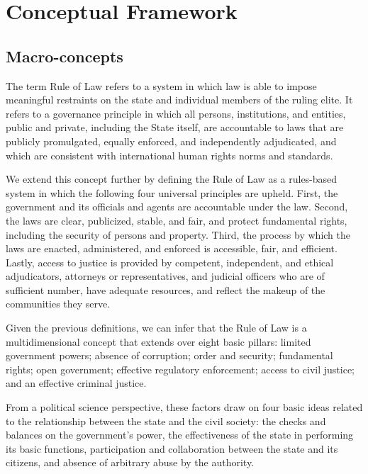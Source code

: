 \documentclass[
]{agujournal2019}
\begin{document}
\section[Conceptual Framework]{\texorpdfstring{Conceptual
Framework}{Conceptual Framework}}\label{conceptual-framework1}

\subsection{Macro-concepts}\label{macro-concepts}

The term Rule of Law refers to a system in which law is able to impose
meaningful restraints on the state and individual members of the ruling
elite. It refers to a governance principle in which all persons,
institutions, and entities, public and private, including the State
itself, are accountable to laws that are publicly promulgated, equally
enforced, and independently adjudicated, and which are consistent with
international human rights norms and standards.

We extend this concept further by defining the Rule of Law as a
rules-based system in which the following four universal principles are
upheld. First, the government and its officials and agents are
accountable under the law. Second, the laws are clear, publicized,
stable, and fair, and protect fundamental rights, including the security
of persons and property. Third, the process by which the laws are
enacted, administered, and enforced is accessible, fair, and efficient.
Lastly, access to justice is provided by competent, independent, and
ethical adjudicators, attorneys or representatives, and judicial
officers who are of sufficient number, have adequate resources, and
reflect the makeup of the communities they serve.

Given the previous definitions, we can infer that the Rule of Law is a
multidimensional concept that extends over eight basic pillars: limited
government powers; absence of corruption; order and security;
fundamental rights; open government; effective regulatory enforcement;
access to civil justice; and an effective criminal justice.

From a political science perspective, these factors draw on four basic
ideas related to the relationship between the state and the civil
society: the checks and balances on the government's power, the
effectiveness of the state in performing its basic functions,
participation and collaboration between the state and its citizens, and
absence of arbitrary abuse by the authority.
\end{document}
